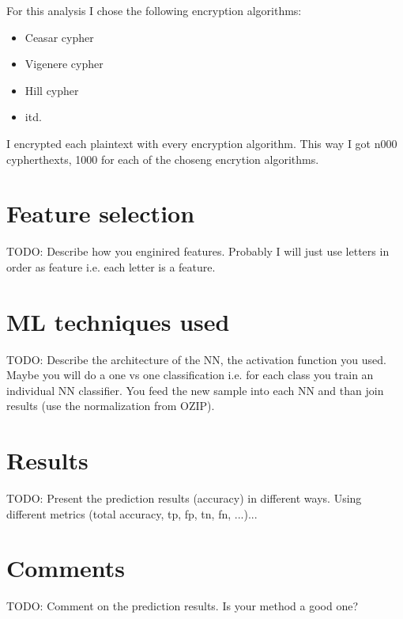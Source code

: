 \documentclass[a4paper]{article}
\begin{document}
For this analysis I chose the following encryption algorithms:

\begin{itemize}
	\item Ceasar cypher
	\item Vigenere cypher
	\item Hill cypher
	\item itd.
\end{itemize}

I encrypted each plaintext with every encryption algorithm. This way I got n000 cypherthexts, 1000 for each of the choseng encrytion algorithms.

\section*{Feature selection}
TODO: Describe how you enginired features. Probably I will just use letters in order as feature i.e. each letter is a feature.


\section*{ML techniques used}
TODO: Describe the architecture of the NN, the activation function you used. Maybe you will do a one vs one classification i.e. for each class you train an individual NN classifier. You feed the new sample into each NN and than join results (use the normalization from OZIP).


\section*{Results}
TODO: Present the prediction results (accuracy) in different ways. Using different metrics (total accuracy, tp, fp, tn, fn, ...)...


\section*{Comments}
TODO: Comment on the prediction results. Is your method a good one?



\end{document}
